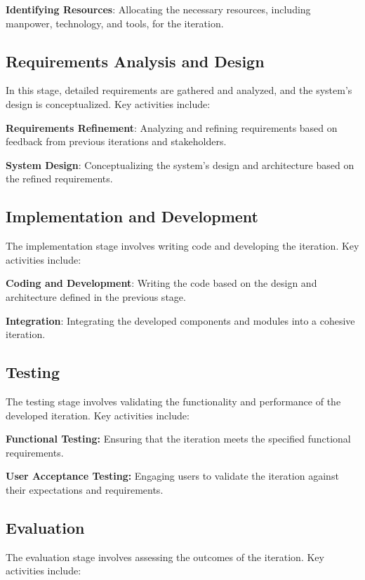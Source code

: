 \textbf{Identifying Resources}:
Allocating the necessary resources, including manpower, technology, and tools, for the iteration.

\subsection{Requirements Analysis and Design}

In this stage, detailed requirements are gathered and analyzed, and the system's design is conceptualized. Key activities include:

\textbf{Requirements Refinement}:
Analyzing and refining requirements based on feedback from previous iterations and stakeholders.

\textbf{System Design}:
Conceptualizing the system's design and architecture based on the refined requirements.

\subsection{Implementation and Development}

The implementation stage involves writing code and developing the iteration. Key activities include:

\textbf{Coding and Development}:
Writing the code based on the design and architecture defined in the previous stage.

\textbf{Integration}:
Integrating the developed components and modules into a cohesive iteration.

\subsection{Testing}

The testing stage involves validating the functionality and performance of the developed iteration. Key activities include:

\textbf{Functional Testing:}
Ensuring that the iteration meets the specified functional requirements.

\textbf{User Acceptance Testing:}
Engaging users to validate the iteration against their expectations and requirements.

\subsection{Evaluation}

The evaluation stage involves assessing the outcomes of the iteration. Key activities include:

